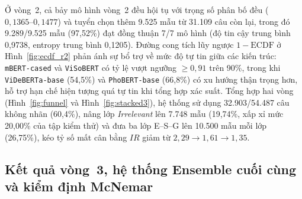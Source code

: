 \documentclass[journal,a4paper]{IEEEtran}
\newcommand{\code}[1]{\texttt{\small #1}}
\begin{document}
Ở vòng~2, cả bảy mô hình vòng~2 đều hội tụ với trọng số phân bố đều ($0{,}1365\text{--}0{,}1477$) và tuyển chọn thêm 9.525 mẫu từ 31.109 câu còn lại, trong đó 9.289/9.525 mẫu (97,52\%) đạt đồng thuận 7/7 mô hình (độ tin cậy trung bình 0,9738, entropy trung bình 0,1205). Đường cong tích lũy ngược $1-\text{ECDF}$ ở Hình~\ref{fig:ecdf_r2} phản ánh sự bổ trợ về mức độ tự tin giữa các kiến trúc: \code{mBERT-cased} và \code{ViSoBERT} có tỷ lệ vượt ngưỡng $\ge 0{,}91$ trên 90\%, trong khi \code{ViDeBERTa-base} (54,5\%) và \code{PhoBERT-base} (66,8\%) có xu hướng thận trọng hơn, hỗ trợ hạn chế hiện tượng quá tự tin khi tổng hợp xác suất. Tổng hợp hai vòng (Hình~\ref{fig:funnel} và Hình~\ref{fig:stacked3}), hệ thống sử dụng 32.903/54.487 câu không nhãn (60,4\%), nâng lớp \textit{Irrelevant} lên 7.748 mẫu (19,74\%, xấp xỉ mức 20,00\% của tập kiểm thử) và đưa ba lớp E--S--G lên 10.500 mẫu mỗi lớp (26,75\%), kéo tỷ số mất cân bằng $IR$ giảm từ $2{,}29 \rightarrow 1{,}61 \rightarrow 1{,}35$.

\subsection{Kết quả vòng~3, hệ thống Ensemble cuối cùng và kiểm định McNemar}
\end{document}
